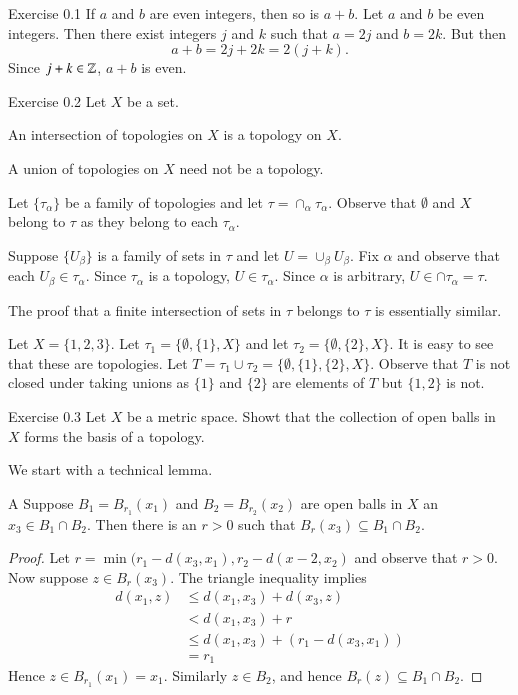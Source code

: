 \documentclass[minion]{homework641}
\begin{document}
\begin{aproblems}

\hproblem Exercise 0.1 
If $a$ and $b$ are even integers, then so is $a+b$.
\solution
Let $a$ and $b$ be even integers.  Then there exist integers
$j$ and $k$ such that $a=2j$ and $b=2k$.  But then
\begin{equation}
a+b = 2j+ 2k = 2(j+k).
\end{equation}
Since $j+k\in\mathbb Z$, $a+b$ is even.

\hproblem Exercise 0.2 
Let $X$ be a set.
\begin{subproblems}
\item An intersection of topologies on $X$ is a topology on $X$.
\item A union of topologies on $X$ need not be a topology.
\end{subproblems}
\subsol
Let $\{\tau_\alpha\}$ be a family of topologies and let $\tau=\cap_\alpha \tau_\alpha$.  
Observe that $\emptyset$ and $X$ belong to $\tau$ as they belong to each $\tau_\alpha$.

Suppose $\{U_\beta\}$ is a family of sets in $\tau$ and let $U=\cup_\beta U_\beta$. 
Fix $\alpha$ and observe that each $U_\beta\in \tau_\alpha$. Since $\tau_\alpha$
is a topology, $U\in\tau_\alpha$.  Since $\alpha$ is arbitrary, $U\in\cap\tau_\alpha=\tau$.

The proof that a finite intersection of sets in $\tau$ belongs to $\tau$ is essentially similar.

\subsol
Let $X=\{1,2,3\}$.  Let $\tau_1 = \{\emptyset, \{1\}, X\}$ and let $\tau_2 = \{\emptyset, \{2\}, X\}$.
It is easy to see that these are topologies.
Let $T=\tau_1\cup \tau_2 = \{\emptyset, \{1\}, \{2\}, X\}$.   Observe that $T$ is not closed under
taking unions as $\{1\}$ and $\{2\}$ are elements of $T$ but $\{1,2\}$ is not.

\hproblem Exercise 0.3 
Let $X$ be a metric space.  Showt that 
the collection of open balls in $X$ forms the basis of a topology.

\solution
We start with a technical lemma.
\begin{lemma}{A}\label{lem:DAMrefine}  
Suppose $B_1=B_{r_1}(x_1)$ and $B_2=B_{r_2}(x_2)$ are 
open balls in $X$ an $x_3\in B_1\cap B_2$.  Then there is an $r>0$ such
that $B_r(x_3)\subseteq B_1\cap B_2$.
\end{lemma}
\begin{proof}
Let $r = \min(r_1-d(x_3,x_1),r_2-d(x-2,x_2)$ and observe that $r>0$.  Now suppose
$z\in B_{r}(x_3)$.  The triangle inequality implies
\begin{align*} 
d(x_1,z)&\le d(x_1,x_3) + d(x_3,z) \\
&< d(x_1,x_3) + r \\
&\le d(x_1,x_3) + ( r_1-d(x_3,x_1) ) \\
&= r_1
\end{align*}
Hence $z\in B_{r_1}(x_1)=x_1$.  Similarly $z\in B_2$, and hence $B_r(z)\subseteq B_1\cap B_2$.
\end{proof}


\end{aproblems}
\end{document}
